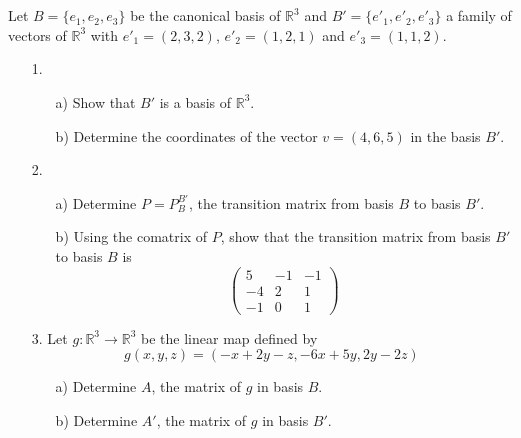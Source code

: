 \documentclass[12pt]{article}
\begin{document}
\newpage  
\section{}
Let $B = \{e_1, e_2, e_3\}$ be the canonical basis of $\mathbb{R}^3$ and $B' = \{e'_1, e'_2, e'_3\}$ a family of vectors of $\mathbb{R}^3$ with
$e'_1 = (2,3,2)$, $e'_2 = (1,2,1)$ and $e'_3 = (1,1,2)$.

\begin{enumerate}
\item[1.] 
   \begin{enumerate}
   \item[a)] Show that $B'$ is a basis of $\mathbb{R}^3$.
   \item[b)] Determine the coordinates of the vector $v = (4,6,5)$ in the basis $B'$.
   \end{enumerate}

\item[2.] 
   \begin{enumerate}
   \item[a)] Determine $P = P^{B'}_B$, the transition matrix from basis $B$ to basis $B'$.
   \item[b)] Using the comatrix of $P$, show that the transition matrix from basis $B'$ to basis $B$ is
   \[
   \begin{pmatrix}
   5 & -1 & -1 \\
   -4 & 2 & 1 \\
   -1 & 0 & 1
   \end{pmatrix}
   \]
   \end{enumerate}

\item[3.] Let $g: \mathbb{R}^3 \rightarrow \mathbb{R}^3$ be the linear map defined by
\begin{equation*}
g(x,y,z) = (-x + 2y - z, -6x + 5y, 2y - 2z)
\end{equation*}
   \begin{enumerate}
   \item[a)] Determine $A$, the matrix of $g$ in basis $B$.
   \item[b)] Determine $A'$, the matrix of $g$ in basis $B'$.
   \end{enumerate}
\end{enumerate}

\newpage
\end{document}
